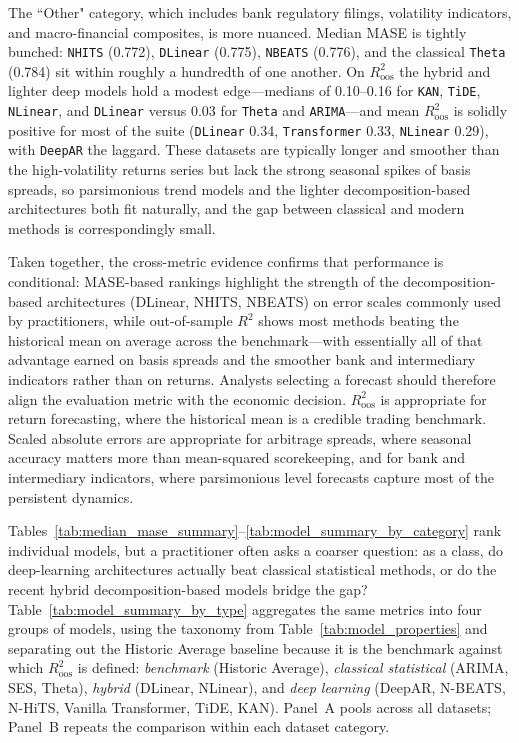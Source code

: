 \documentclass{article}
\begin{document}
The ``Other" category, which includes bank regulatory filings, volatility indicators, and macro-financial composites, is more nuanced. Median MASE is tightly bunched: \texttt{NHITS} (0.772), \texttt{DLinear} (0.775), \texttt{NBEATS} (0.776), and the classical \texttt{Theta} (0.784) sit within roughly a hundredth of one another. On $R^2_{\text{oos}}$ the hybrid and lighter deep models hold a modest edge---medians of 0.10--0.16 for \texttt{KAN}, \texttt{TiDE}, \texttt{NLinear}, and \texttt{DLinear} versus 0.03 for \texttt{Theta} and \texttt{ARIMA}---and mean $R^2_{\text{oos}}$ is solidly positive for most of the suite (\texttt{DLinear} 0.34, \texttt{Transformer} 0.33, \texttt{NLinear} 0.29), with \texttt{DeepAR} the laggard. These datasets are typically longer and smoother than the high-volatility returns series but lack the strong seasonal spikes of basis spreads, so parsimonious trend models and the lighter decomposition-based architectures both fit naturally, and the gap between classical and modern methods is correspondingly small.

Taken together, the cross-metric evidence confirms that performance is conditional: MASE-based rankings highlight the strength of the decomposition-based architectures (DLinear, NHITS, NBEATS) on error scales commonly used by practitioners, while out-of-sample $R^2$ shows most methods beating the historical mean on average across the benchmark---with essentially all of that advantage earned on basis spreads and the smoother bank and intermediary indicators rather than on returns. Analysts selecting a forecast should therefore align the evaluation metric with the economic decision. $R^2_{\text{oos}}$ is appropriate for return forecasting, where the historical mean is a credible trading benchmark. Scaled absolute errors are appropriate for arbitrage spreads, where seasonal accuracy matters more than mean-squared scorekeeping, and for bank and intermediary indicators, where parsimonious level forecasts capture most of the persistent dynamics.

Tables~\ref{tab:median_mase_summary}--\ref{tab:model_summary_by_category} rank individual models, but a practitioner often asks a coarser question: as a class, do deep-learning architectures actually beat classical statistical methods, or do the recent hybrid decomposition-based models bridge the gap? Table~\ref{tab:model_summary_by_type} aggregates the same metrics into four groups of models, using the taxonomy from Table~\ref{tab:model_properties} and separating out the Historic Average baseline because it is the benchmark against which $R^2_{\text{oos}}$ is defined: \textit{benchmark} (Historic Average), \textit{classical statistical} (ARIMA, SES, Theta), \textit{hybrid} (DLinear, NLinear), and \textit{deep learning} (DeepAR, N-BEATS, N-HiTS, Vanilla Transformer, TiDE, KAN). Panel~A pools across all datasets; Panel~B repeats the comparison within each dataset category.
\end{document}
